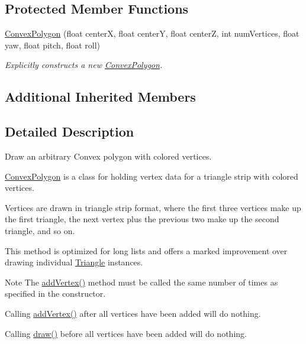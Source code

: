 \subsection*{Protected Member Functions}
\begin{DoxyCompactItemize}
\item 
\hyperlink{classtsgl_1_1_convex_polygon_a24507f367aec93ffba00f1c50167362f}{Convex\+Polygon} (float centerX, float centerY, float centerZ, int num\+Vertices, float yaw, float pitch, float roll)
\begin{DoxyCompactList}\small\item\em Explicitly constructs a new \hyperlink{classtsgl_1_1_convex_polygon}{Convex\+Polygon}. \end{DoxyCompactList}\end{DoxyCompactItemize}
\subsection*{Additional Inherited Members}


\subsection{Detailed Description}
Draw an arbitrary Convex polygon with colored vertices. 

\hyperlink{classtsgl_1_1_convex_polygon}{Convex\+Polygon} is a class for holding vertex data for a triangle strip with colored vertices.

Vertices are drawn in triangle strip format, where the first three vertices make up the first triangle, the next vertex plus the previous two make up the second triangle, and so on.

This method is optimized for long lists and offers a marked improvement over drawing individual \hyperlink{classtsgl_1_1_triangle}{Triangle} instances. \begin{DoxyNote}{Note}
The \hyperlink{classtsgl_1_1_shape_ac0ea13ecde43ce62262f82597fb94755}{add\+Vertex()} method must be called the same number of times as specified in the constructor. 

Calling \hyperlink{classtsgl_1_1_shape_ac0ea13ecde43ce62262f82597fb94755}{add\+Vertex()} after all vertices have been added will do nothing. 

Calling \hyperlink{classtsgl_1_1_shape_ae0905e73f1652d92cef9c7f2c38572f3}{draw()} before all vertices have been added will do nothing. 
\end{DoxyNote}


